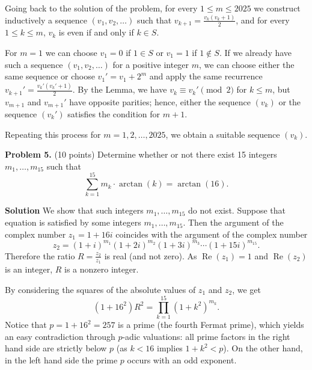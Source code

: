 \documentclass{article}
\begin{document}
Going back to the solution of the problem,
for every $1 \leq m \leq 2025$ we construct inductively
a sequence $(v_1, v_2, \dots)$ such that $v_{k+1} = \frac{v_k(v_k+1)}{2}$,
and for every $1 \leq k \leq m$, $v_k$ is even
if and only if $k \in S$.

For $m = 1$ we can choose $v_1 = 0$ if $1 \in S$ or $v_1 = 1$ if $1 \notin S$.
If we already have such a sequence $(v_1, v_2, \dots)$
for a positive integer $m$, we can choose either the same sequence
or choose $v_1' = v_1 + 2^m$ and apply the same recurrence $v_{k+1}' = \frac{v_k'(v_k'+1)}{2}$. By the Lemma, we have $v_k \equiv v_k' \pmod{2}$ for $k \leq m$, but $v_{m+1}$ and $v_{m+1}'$ have opposite parities; hence, either the sequence $(v_k)$ or the sequence $(v_k')$ satisfies the condition for $m + 1$.

Repeating this process for $m = 1, 2, \dots, 2025$, we obtain a suitable sequence $(v_k)$.

\textbf{Problem 5.} (10 points)
Determine whether or not there exist 15 integers
\( m_1, \dots, m_{15} \) such that
\[
\sum_{k=1}^{15} m_k \cdot \arctan(k) = \arctan(16).
\]

\textbf{Solution}
We show that such integers \(m_1, \dots, m_{15}\) do not exist.
Suppose that equation is satisfied by some integers
\(m_1, \dots, m_{15}\). Then the argument of the complex number \(z_1 = 1 + 16i\) coincides with the argument of the complex number
\[
z_2 = (1 + i)^{m_1} (1 + 2i)^{m_2} (1 + 3i)^{m_3} \cdots (1 + 15i)^{m_{15}}.
\]
Therefore the ratio \( R = \frac{z_2}{z_1} \) is real (and not zero). As \(\operatorname{Re}(z_1) = 1\) and \(\operatorname{Re}(z_2)\) is an integer, \(R\) is a nonzero integer.

By considering the squares of the absolute values of \(z_1\) and \(z_2\), we get
\[
(1 + 16^2)R^2 = \prod_{k=1}^{15} (1 + k^2)^{m_k}.
\]
Notice that \( p = 1 + 16^2 = 257 \)
is a prime (the fourth Fermat prime), which yields an easy contradiction
through \(p\)-adic valuations: all prime factors in the right hand side are strictly
below \(p\) (as \(k < 16\) implies \(1 + k^2 < p\)).
On the other hand, in the left hand side the prime \(p\)
occurs with an odd exponent.
\end{document}
